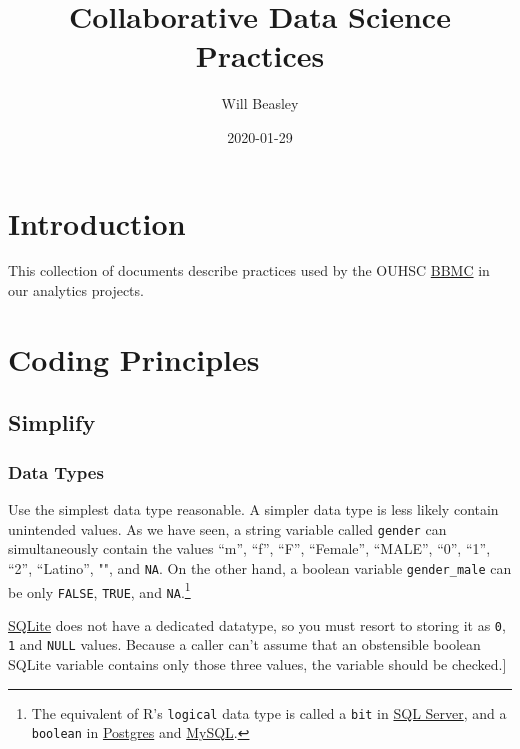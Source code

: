 \documentclass[
]{book}
\title{Collaborative Data Science Practices}
\author{Will Beasley}
\date{2020-01-29}
\begin{document}
\maketitle

{
\setcounter{tocdepth}{1}
\tableofcontents
}
\hypertarget{intro}{%
\chapter{Introduction}\label{intro}}

This collection of documents describe practices used by the OUHSC \href{https://ouhsc.edu/bbmc}{BBMC} in our analytics projects.

\hypertarget{coding}{%
\chapter{Coding Principles}\label{coding}}

\hypertarget{coding-simplify}{%
\section{Simplify}\label{coding-simplify}}

\hypertarget{coding-simplify-types}{%
\subsection{Data Types}\label{coding-simplify-types}}

Use the simplest data type reasonable. A simpler data type is less likely contain unintended values. As we have seen, a string variable called \texttt{gender} can simultaneously contain the values ``m'', ``f'', ``F'', ``Female'', ``MALE'', ``0'', ``1'', ``2'', ``Latino'', "", and \texttt{NA}. On the other hand, a boolean variable \texttt{gender\_male} can be only \texttt{FALSE}, \texttt{TRUE}, and \texttt{NA}.\footnote{The equivalent of R's \texttt{logical} data type is called a \texttt{bit} in \href{https://docs.microsoft.com/en-us/sql/t-sql/data-types/bit-transact-sql}{SQL Server}, and a \texttt{boolean} in \href{https://www.postgresql.org/docs/current/datatype-boolean.html}{Postgres} and \href{https://dev.mysql.com/doc/refman/8.0/en/boolean-literals.html}{MySQL}.}

\href{https://www.sqlite.org/datatype3.html}{SQLite} does not have a dedicated datatype, so you must resort to storing it as \texttt{0}, \texttt{1} and \texttt{NULL} values. Because a caller can't assume that an obstensible boolean SQLite variable contains only those three values, the variable should be checked.{]}
\end{document}
